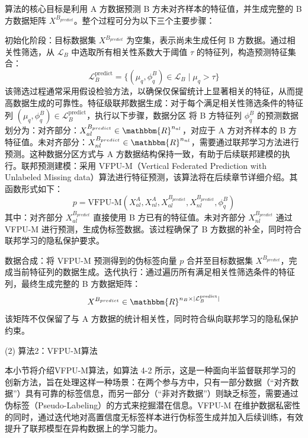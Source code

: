 算法的核心目标是利用 A 方数据预测 B 方未对齐样本的特征值，并生成完整的 B 方数据矩阵 $X^{B_{predict}}$。整个过程可分为以下三个主要步骤：

初始化阶段：目标数据集 $X^{B_{predict}}$ 为空集，表示尚未生成任何 B 方数据。通过相关性筛选，从 $\mathcal{L}_B$ 中选取所有相关性系数大于阈值 $\tau$ 的特征列，构造预测特征集合：
\begin{equation}
	\mathcal{L}_B^{\text{predict}} = \{(\mu_q, \phi^B_q) \in \mathcal{L}_B \mid \mu_q > \tau\}
\end{equation}
该筛选过程通常采用假设检验方法，以确保仅保留统计上显著相关的特征，从而提高数据生成的可靠性。特征级联邦数据生成：对于每个满足相关性筛选条件的特征列 $(\mu_q, \phi^B_q) \in \mathcal{L}_B^{\text{predict}}$，执行以下步骤，数据分区  将 B 方特征列 $\phi^B_q$ 的预测数据划分为：对齐部分：$X_{al}^{B_{predict}} \in \mathbbm{R}^{n_{al}}$，对应于 A 方对齐样本的 B 方特征值。未对齐部分：$X_{nl}^{B_{predict}} \in \mathbbm{R}^{n_{nl}}$，需要通过联邦学习方法进行预测。这种数据分区方式与 A 方数据结构保持一致，有助于后续联邦建模的执行。联邦预测建模：采用 VFPU-M（Vertical Federated Prediction with Unlabeled Missing data）算法进行特征预测，该算法将在后续章节详细介绍。其函数形式如下：
\begin{equation}
	p = \text{VFPU-M}(X_{al}^A, X_{nl}^A, X_{al}^{B_{predict}}, X_{nl}^{B_{predict}}, \phi^B_q)
\end{equation}
其中：对齐部分 $X_{al}^{B_{predict}}$ 直接使用 B 方已有的特征值。未对齐部分 $X_{nl}^{B_{predict}}$ 通过 VFPU-M 进行预测，生成伪标签数据。该过程确保了 B 方数据的补全，同时符合联邦学习的隐私保护要求。

数据合成：将 VFPU-M 预测得到的伪标签向量 $p$ 合并至目标数据集 $X^{B_{predict}}$，完成当前特征列的数据生成。迭代执行：通过遍历所有满足相关性筛选条件的特征列，最终生成完整的 B 方数据矩阵：
\begin{equation}
	X^{B_{predict}} \in \mathbbm{R}^{n_B \times |\mathcal{L}_B^{\text{predict}}|}
\end{equation}
该矩阵不仅保留了与 A 方数据的统计相关性，同时符合纵向联邦学习的隐私保护约束。

(2) 算法2：VFPU-M算法

本小节将介绍VFPU-M算法，如算法 4-2 所示，这是一种面向半监督联邦学习的创新方法，旨在处理这样一种场景：在两个参与方中，只有一部分数据（“对齐数据”）具有可靠的标签信息，而另一部分（“非对齐数据”）则缺乏标签，需要通过伪标签（Pseudo-Labeling）的方式来挖掘潜在信息。VFPU-M 在维护数据私密性的同时，通过迭代地对高置信度无标签样本进行伪标签生成并加入后续训练，有效提升了联邦模型在异构数据上的学习能力。

